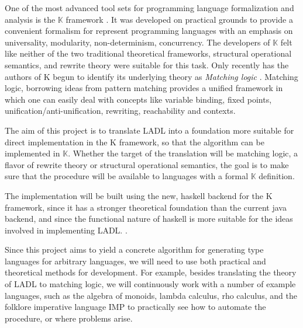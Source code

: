 One of the most advanced tool sets for programming language formalization and analysis is the $\mathbb{K}$ framework \cite{stefuanescu2016semantics}. It was developed on practical grounds to provide a convenient formalism for represent programming languages with an emphasis on universality, modularity, non-determinism, concurrency. The developers of $\mathbb{K}$ felt like neither of the two traditional theoretical frameworks, structural operational semantics, and rewrite theory were suitable for this task. \cite{rosu2010overview} Only recently has the authors of K begun to identify its underlying theory as \textit{Matching logic} \cite{rosu2017matching}. Matching logic, borrowing ideas from pattern matching provides a unified framework in which one can easily deal with concepts like variable binding, fixed points, unification/anti-unification, rewriting, reachability and contexts.

The aim of this project is to translate LADL into a foundation more suitable for direct implementation in the K framework, so that the algorithm can be implemented in $\mathbb{K}$. Whether the target of the translation will be matching logic, a flavor of rewrite theory or structural operational semantics, the goal is to make sure that the procedure will be available to languages with a formal $\mathbb{K}$ definition.

The implementation will be built using the new, haskell backend for the K framework, since it has a stronger theoretical foundation than the current java backend, and since the functional nature of haskell is more suitable for the ideas involved in implementing LADL. \cite{kore}.

Since this project aims to yield a concrete algorithm for generating type languages for arbitrary languages, we will need to use both practical and theoretical methods for development. For example, besides translating the theory of LADL to matching logic, we will continuously work with a number of example languages, such as the algebra of monoids, lambda calculus, rho calculus, and the folklore imperative language IMP to practically see how to automate the procedure, or where problems arise.









